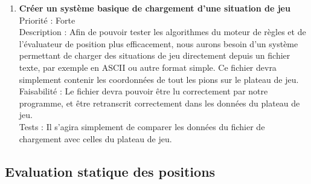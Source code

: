 \documentclass[12pt]{article}
\begin{document}
			\begin{enumerate}

				\item \textbf{Créer un système basique de chargement d'une situation de jeu} \\[0.7\baselineskip]
				Priorité : Forte \\[0.7\baselineskip]
				Description : Afin de pouvoir tester les algorithmes du moteur de règles et de l'évaluateur de position plus efficacement, nous aurons besoin d'un système permettant de charger des situations de jeu directement depuis un fichier texte, par exemple en ASCII ou autre format simple. Ce fichier devra simplement contenir les coordonnées de tout les pions sur le plateau de jeu. \\[0.7\baselineskip]
				Faisabilité : Le fichier devra pouvoir être lu correctement par notre programme, et être retranscrit correctement dans les données du plateau de jeu. \\[0.7\baselineskip]
				Tests : Il s'agira simplement de comparer les données du fichier de chargement avec celles du plateau de jeu. \\[0.7\baselineskip]
				
			\end{enumerate}

		\subsection{Evaluation statique des positions}
\end{document}
